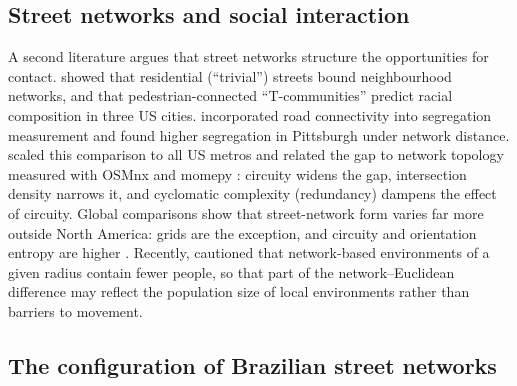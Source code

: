 \subsection{Street networks and social interaction}

A second literature argues that street networks structure the opportunities for contact.
\citet{grannis1998importance} showed that residential (``trivial'') streets bound neighbourhood networks, and
\citet{grannis2005tcommunities} that pedestrian-connected ``T-communities'' predict racial composition in three US
cities. \citet{roberto2018spatial} incorporated road connectivity into segregation measurement and found higher
segregation in Pittsburgh under network distance. \citet{knaap2024segregated} scaled this comparison to all US
metros and related the gap to network topology measured with OSMnx \citep{boeing2017osmnx} and momepy
\citep{fleischmann2019momepy}: circuity widens the gap, intersection density narrows it, and cyclomatic
complexity (redundancy) dampens the effect of circuity. Global comparisons show that street-network form varies
far more outside North America: grids are the exception, and circuity and orientation entropy are higher
\citep{boeing2019urban,boeing2022street}. Recently, \citet{saporito2026reconsidering} cautioned that network-based
environments of a given radius contain fewer people, so that part of the network--Euclidean difference may reflect
the population size of local environments rather than barriers to movement.

\subsection{The configuration of Brazilian street networks}

